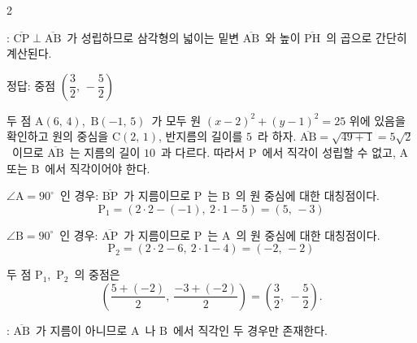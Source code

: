 \documentclass[10pt,fleqn]{article}
\begin{document}
\begin{multicols*}{2}
\begin{dmcriticalpoint}
: $\overline{\mathrm{CP}} \perp \overline{\mathrm{AB}}$\ 가 성립하므로 삼각형의 넓이는 밑변 $\overline{\mathrm{AB}}$\ 와 높이 $\overline{\mathrm{PH}}$\ 의 곱으로 간단히 계산된다.
\end{dmcriticalpoint}

\begin{dmanswerbox}
정답: 중점 $\left( \dfrac{3}{2},\, -\dfrac{5}{2} \right)$
\end{dmanswerbox}

두 점 $\mathrm{A}(6,\, 4)$,\ $\mathrm{B}(-1,\, 5)$\ 가 모두 원 $(x-2)^2 + (y-1)^2 = 25$ 위에 있음을 확인하고 원의 중심을 $\mathrm{C}(2,\, 1)$, 반지름의 길이를 $5$\ 라 하자. $\overline{\mathrm{AB}} = \sqrt{49 + 1} = 5\sqrt{2}$\ 이므로 $\overline{\mathrm{AB}}$\ 는 지름의 길이 $10$\ 과 다르다. 따라서 $\mathrm{P}$\ 에서 직각이 성립할 수 없고, $\mathrm{A}$ 또는 $\mathrm{B}$\ 에서 직각이어야 한다.

$\angle \mathrm{A} = 90^{\circ}$\ 인 경우: $\overline{\mathrm{BP}}$\ 가 지름이므로 $\mathrm{P}$\ 는 $\mathrm{B}$\ 의 원 중심에 대한 대칭점이다.
\[ \mathrm{P}_1 = (2 \cdot 2 - (-1),\ 2 \cdot 1 - 5) = (5,\, -3) \]

$\angle \mathrm{B} = 90^{\circ}$\ 인 경우: $\overline{\mathrm{AP}}$\ 가 지름이므로 $\mathrm{P}$\ 는 $\mathrm{A}$\ 의 원 중심에 대한 대칭점이다.
\[ \mathrm{P}_2 = (2 \cdot 2 - 6,\ 2 \cdot 1 - 4) = (-2,\, -2) \]

두 점 $\mathrm{P}_1$,\ $\mathrm{P}_2$\ 의 중점은
\[ \left( \dfrac{5 + (-2)}{2},\ \dfrac{-3 + (-2)}{2} \right) = \left( \dfrac{3}{2},\ -\dfrac{5}{2} \right). \]

\begin{dmcriticalpoint}
: $\overline{\mathrm{AB}}$\ 가 지름이 아니므로 $\mathrm{A}$\ 나 $\mathrm{B}$\ 에서 직각인 두 경우만 존재한다.
\end{dmcriticalpoint}

\end{multicols*}


\end{document}
